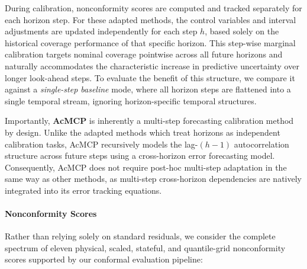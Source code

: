 \documentclass[12pt, a4paper]{article}
\begin{document}
During calibration, nonconformity scores are computed and tracked separately for each horizon step. For these adapted methods, the control variables and interval adjustments are updated independently for each step \(h\), based solely on the historical coverage performance of that specific horizon. This step-wise marginal calibration targets nominal coverage pointwise across all future horizons and naturally accommodates the characteristic increase in predictive uncertainty over longer look-ahead steps. To evaluate the benefit of this structure, we compare it against a \textit{single-step baseline} mode, where all horizon steps are flattened into a single temporal stream, ignoring horizon-specific temporal structures.

Importantly, \textbf{AcMCP} is inherently a multi-step forecasting calibration method by design. Unlike the adapted methods which treat horizons as independent calibration tasks, AcMCP recursively models the lag-\((h-1)\) autocorrelation structure across future steps using a cross-horizon error forecasting model. Consequently, AcMCP does not require post-hoc multi-step adaptation in the same way as other methods, as multi-step cross-horizon dependencies are natively integrated into its error tracking equations.

\paragraph{Nonconformity Scores}
Rather than relying solely on standard residuals, we consider the complete spectrum of eleven physical, scaled, stateful, and quantile-grid nonconformity scores supported by our conformal evaluation pipeline:
\end{document}
